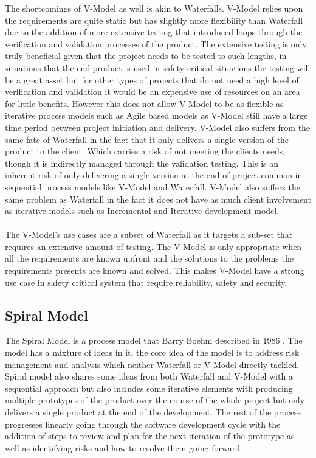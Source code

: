 \documentclass{style/CRPITStyle}
\renewcommand{\cite}{\citep}
\begin{document}
The shortcomings of V-Model as well is akin to Waterfalls.
V-Model relies upon the requirements are quite static but has slightly more
flexibility than Waterfall due to the addition of more extensive testing that introduced loops 
through the verification and validation processes of the product. 
The extensive testing is only truly beneficial given that the project needs to
be tested to such lengths, in situations that the end-product is used in safety
critical situations the testing will be a great asset but for other types of
projects that do not need a high level of verification and validation it would
be an expensive use of resources on an area for little benefits.
However this does not allow V-Model to be as flexible as iterative process models such as
Agile based models as V-Model still have a large time period between project
initiation and delivery. 
V-Model also suffers from the same fate of Waterfall in the fact that it only
delivers a single version of the product to the client. Which carries a risk of 
not meeting the clients needs, though it is indirectly managed through the validation testing.
This is an inherent risk of only delivering a single version at the end
of project common in sequential process models like V-Model and Waterfall.
V-Model also suffers the same problem as Waterfall in the fact it does not 
have as much client involvement as iterative models such as Incremental and
Iterative development model.

\paragraph{}
The V-Model's use cases are a subset of Waterfall as it targets a sub-set that
requires an extensive amount of testing.
The V-Model is only appropriate when all the requirements are known upfront and
the solutions to the problems the requirements presents are known and solved.
This makes V-Model have a strong use
case in safety critical system that require reliability, safety and security.


\subsection{Spiral Model} %

The Spiral Model is a process model that Barry Boehm described in 1986 \cite{boehm:1988:spiral}.
The model has a mixture of ideas in it, the core idea of the model is to address risk management and analysis
which neither Waterfall or V-Model directly tackled.
Spiral model also shares some ideas from both Waterfall and V-Model with a sequential approach 
but also includes some iterative elements with producing multiple prototypes of the 
product over the course of the whole project but only delivers a single product
at the end of the development.
The rest of the process progresses linearly going through the software 
development cycle with the addition of steps to review and plan for
the next iteration of the prototype as well as identifying risks and
how to resolve them going forward.
\end{document}

